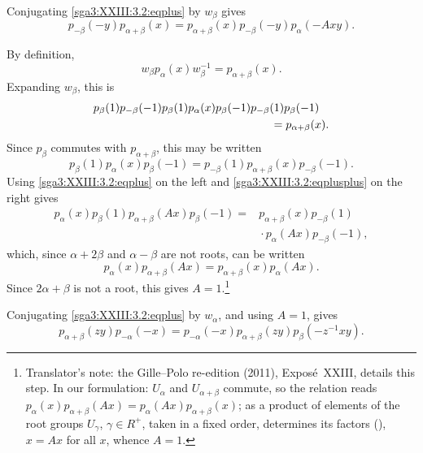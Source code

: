 Conjugating \eqref{sga3:XXIII:3.2:eqplus} by \(w_\beta\) gives
\begin{equation}
  p_{-\beta}(-y)p_{\alpha+\beta}(x)
    =p_{\alpha+\beta}(x)p_{-\beta}(-y)p_\alpha(-Axy).
  \tag{++}
  \label{sga3:XXIII:3.2:eqplusplus}
\end{equation}

By definition,
\[
  w_\beta p_\alpha(x)w_\beta^{-1}=p_{\alpha+\beta}(x).
\]
Expanding \(w_\beta\), this is
\[
\begin{aligned}
  &p_\beta(1)p_{-\beta}(-1)p_\beta(1)p_\alpha(x)
    p_\beta(-1)p_{-\beta}(1)p_\beta(-1)\\
  &\hspace{55mm}=p_{\alpha+\beta}(x).
\end{aligned}
\]
Since \(p_\beta\) commutes with \(p_{\alpha+\beta}\), this may be
written
\[
  p_\beta(1)p_\alpha(x)p_\beta(-1)
    =p_{-\beta}(1)p_{\alpha+\beta}(x)p_{-\beta}(-1).
\]
Using \eqref{sga3:XXIII:3.2:eqplus} on the left and
\eqref{sga3:XXIII:3.2:eqplusplus} on the right gives
\[
\begin{aligned}
  p_\alpha(x)p_\beta(1)p_{\alpha+\beta}(Ax)p_\beta(-1)
   ={}&p_{\alpha+\beta}(x)p_{-\beta}(1)\\
     &{}\cdot p_\alpha(Ax)p_{-\beta}(-1),
\end{aligned}
\]
which, since \(\alpha+2\beta\) and \(\alpha-\beta\) are not roots, can be
written
\[
  p_\alpha(x)p_{\alpha+\beta}(Ax)
    =p_{\alpha+\beta}(x)p_\alpha(Ax).
\]
Since \(2\alpha+\beta\) is not a root, this gives \(A=1\).\footnote{Translator's note: the Gille--Polo re-edition (2011), Exposé~XXIII, details
this step. In our formulation: \(U_\alpha\) and \(U_{\alpha+\beta}\) commute, so the
relation reads \(p_\alpha(x)p_{\alpha+\beta}(Ax)=p_\alpha(Ax)p_{\alpha+\beta}(x)\); as a
product of elements of the root groups \(U_\gamma\), \(\gamma\in R^+\), taken in a fixed
order, determines its factors (),
\(x=Ax\) for all \(x\), whence \(A=1\).}

Conjugating \eqref{sga3:XXIII:3.2:eqplus} by \(w_\alpha\), and using
\(A=1\), gives
\begin{equation}
  p_{\alpha+\beta}(zy)p_{-\alpha}(-x)
   =p_{-\alpha}(-x)p_{\alpha+\beta}(zy)
      p_\beta(-z^{-1}xy).
  \tag{+++}
  \label{sga3:XXIII:3.2:eqplusplusplus}
\end{equation}

